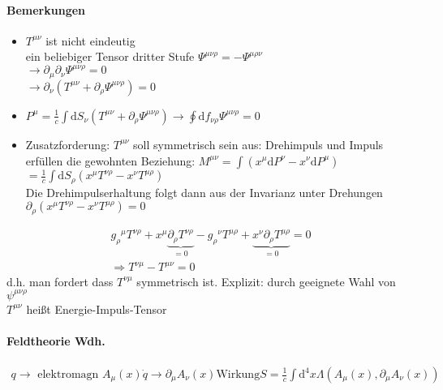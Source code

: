 \documentclass[a4paper]{article}
\begin{document}
\paragraph{Bemerkungen}
\begin{itemize}
  \item $T^{\mu\nu}$ ist nicht eindeutig \\ ein beliebiger Tensor dritter Stufe
  $\Psi^{\mu\nu\rho}=-\Psi^{\mu\rho\nu}$\\ $\rightarrow
  \partial_\mu\partial_\nu\Psi^{\mu\nu\rho}=0$\\$\rightarrow
  \partial_\nu(T^{\mu\nu}+\partial_\rho \Psi^{\mu\nu\rho} )=0$
  \item $P^\mu=\frac{1}{c}\int \mathrm{d}S_\nu \left( T^{\mu\nu}+\partial_\rho
  \Psi^{\mu\nu\rho} \right)\rightarrow \oint \mathrm{d}f_{\nu\rho} \Psi^{\mu\nu\rho}=0 $
  \item Zusatzforderung: $T^{\mu\nu}$ soll symmetrisch sein aus: Drehimpuls und
  Impuls erfüllen die gewohnten Beziehung: $M^{\mu\nu}=\int\left( x^\mu
  \mathrm{d}P^\nu-x^\nu \mathrm{d}P^\mu \right)$\\$=\frac{1}{c}\int \mathrm{d}S_\rho\left( x^\mu
  T^{\nu\rho}-x^\nu T^{\mu\rho} \right)$\\ Die Drehimpulserhaltung folgt dann
  aus der Invarianz unter Drehungen\\ $\partial_\rho\left( x^\mu
  T^{\nu\rho}-x^\nu T^{\mu\rho} \right)=0$
\end{itemize}
\begin{align}
g_\rho{}^\mu T^{\nu\rho}+x^\mu \underbrace{\partial_\rho
T^{\nu\rho}}_{=0}-g_\rho{}^\nu T^{\mu\rho}+\underbrace{x^\nu \partial_\rho
T^{\mu\rho}}_{=0}=0\\
\Rightarrow T^{\nu\mu}-T^{\mu\nu}=0
\end{align}
d.h. man fordert dass $T^{\nu\mu}$ symmetrisch ist. Explizit: durch
geeignete Wahl von $\psi^{\mu\nu\rho}$ \\
$T^{\mu\nu}$ heißt Energie-Impuls-Tensor

\paragraph{Feldtheorie Wdh.}
\begin{align}
q\rightarrow \text{ elektromagn } A_\mu(x)
\dot{q} \rightarrow \partial_\mu A_\nu(x)
\text{Wirkung} S=\frac{1}{c}\int \mathrm{d}^4x \Lambda(A_\mu(x),\partial_\mu
A_\nu(x))
\end{align}
\end{document}
